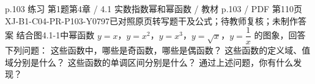 \par\noindent\begin{minipage}{\linewidth}
\begin{bankitem}{p.103 练习 第1题}{第4章 / 4.1 实数指数幂和幂函数 / 教材 p.103 / PDF 第110页}{XJ-B1-C04-PR-P103-Y0797}{已对照原页转写题干及公式；待教师复核；未制作答案}
结合图4.1-1中幂函数 $y=x$，$y=x^2$，$y=x^3$，$y=\sqrt x$，$y=\dfrac1x$ 的图象，回答下列问题：
这些函数中，哪些是奇函数，哪些是偶函数？
这些函数的定义域、值域分别是什么？
这些函数的单调区间分别是什么？
通过上述问题，你有什么发现？
\end{bankitem}
\end{minipage}\par\medskip
